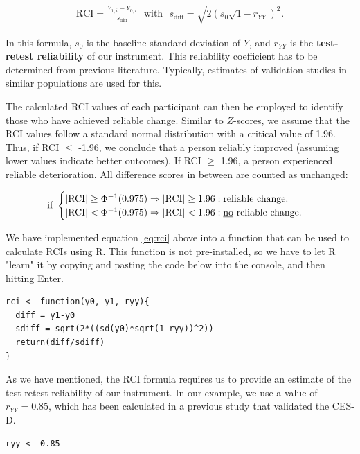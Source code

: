 \begin{align}
\label{eq:rci}
\text{RCI} = \frac{Y_{1,i}-Y_{0,i}}{s_{\text{diff}}} ~~~ \text{with} ~~~ s_{\text{diff}} = \sqrt{2(s_0\sqrt{1-r_{YY}})^2}.
\end{align}

In this formula, $s_{0}$ is the baseline standard deviation of $Y$, and $r_{YY}$ is the \textbf{test-retest reliability} of our instrument. This reliability coefficient has to be determined from previous literature. Typically, estimates of validation studies in similar populations are used for this. 

The calculated RCI values of each participant can then be employed to identify those who have achieved reliable change. Similar to $Z$-scores, we assume that the RCI values follow a standard normal distribution with a critical value of 1.96. Thus, if RCI $\leq$ -1.96, we conclude that a person reliably improved (assuming lower values indicate better outcomes). If RCI $\geq$ 1.96, a person experienced reliable deterioration. All difference scores in between are counted as unchanged:

\begin{align}
\text{if}~
\begin{cases}
|\text{RCI}| \geq \Phi^{-1}(0.975) \Rightarrow |\text{RCI}| \geq 1.96: \text{reliable change.} \\
|\text{RCI}| < \Phi^{-1}(0.975) \Rightarrow |\text{RCI}| < 1.96: \text{\underline{no} reliable change.}
\end{cases}
\end{align}

We have implemented equation \ref{eq:rci} above into a function that can be used to calculate RCIs using \textsf{R}. This function is not pre-installed, so we have to let \textsf{R} "learn" it by copying and pasting the code below into the console, and then hitting Enter.

\begin{lstlisting}
rci <- function(y0, y1, ryy){
  diff = y1-y0
  sdiff = sqrt(2*((sd(y0)*sqrt(1-ryy))^2))
  return(diff/sdiff)
} 
\end{lstlisting}

As we have mentioned, the RCI formula requires us to provide an estimate of the test-retest reliability of our instrument. In our example, we use a value of $r_{YY}=0.85$, which has been calculated in a previous study that validated the CES-D.

\begin{lstlisting}
ryy <- 0.85
\end{lstlisting}

